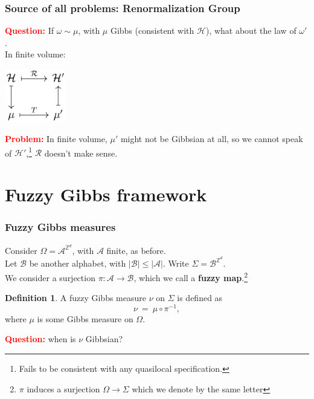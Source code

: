 \documentclass{beamer}
\newcommand{\A}{\mathcal{A}}
\newcommand{\B}{\mathcal{B}}
\renewcommand{\H}{\mathcal{H}}
\newcommand{\Z}{\mathbb{Z}}
\newcommand{\ra}{\rightarrow}
\newcommand{\1}{\mathbbm{1}}
\newcommand{\5}{\vspace{0.5cm}}
\newcommand{\3}{\vspace{0.3cm}}
\theoremstyle{definition}
\newtheorem{df}[thm]{Definition}
\begin{document}
\begin{frame}
\frametitle{Source of all problems: Renormalization Group}
\textcolor{red}{\textbf{Question:}} If $\omega\sim\mu$, with $\mu$ Gibbs (consistent with $\H$), what about the law of $\omega'$.\\\vspace{0.5cm}\pause
In finite volume:\\
\begin{center}
\includegraphics[width=0.2\textwidth]{diagram}
\end{center}\pause
\textcolor{red}{\textbf{Problem:}} In finite volume, $\mu'$ might not be Gibbsian at all, so we cannot speak of $\H'$,\footnote{Fails to be consistent with any quasilocal specification.} $\mathcal{R}$ doesn't make sense.
\end{frame}


\section{Fuzzy Gibbs framework}


\begin{frame}
\frametitle{Fuzzy Gibbs measures}
Consider $\Omega=\A^{\Z^d}$, with $\A$ finite, as before. \\\vspace{0.5cm}\pause
Let $\B$ be another alphabet, with $|\B|\leq|\A|$. Write $\Sigma=\B^{\Z^d}$. \\\vspace{0.5cm}\pause
We consider a surjection $\pi:\A\ra\B$, which we call a \textbf{fuzzy map}.\footnote{$\pi$ induces a surjection $\Omega\ra\Sigma$ which we denote by the same letter}\pause
\begin{df}
A fuzzy Gibbs measure $\nu$ on $\Sigma$ is defined as
$$\nu ~=~ \mu\circ\pi^{-1},$$
where $\mu$ is some Gibbs measure on $\Omega$.
\end{df}\vspace{0.2cm}\pause
\textcolor{red}{\textbf{Question:}} when is $\nu$ Gibbsian?
\end{frame}
\end{document}
